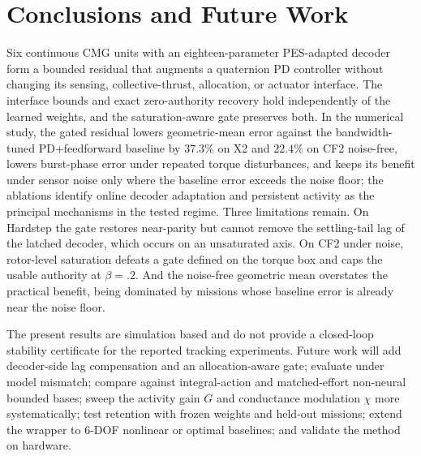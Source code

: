 \documentclass[letterpaper, 10 pt, conference]{ieeeconf}
\begin{document}
\section{Conclusions and Future Work}
\label{sec:conclusion}
Six continuous CMG units with an eighteen-parameter PES-adapted decoder form a bounded residual that augments a quaternion PD controller without changing its sensing, collective-thrust, allocation, or actuator interface. The interface bounds and exact zero-authority recovery hold independently of the learned weights, and the saturation-aware gate preserves both. In the numerical study, the gated residual lowers geometric-mean error against the bandwidth-tuned PD+feedforward baseline by $37.3\%$ on X2 and $22.4\%$ on CF2 noise-free, lowers burst-phase error under repeated torque disturbances, and keeps its benefit under sensor noise only where the baseline error exceeds the noise floor; the ablations identify online decoder adaptation and persistent activity as the principal mechanisms in the tested regime. Three limitations remain. On Hardstep the gate restores near-parity but cannot remove the settling-tail lag of the latched decoder, which occurs on an unsaturated axis. On CF2 under noise, rotor-level saturation defeats a gate defined on the torque box and caps the usable authority at $\beta=.2$. And the noise-free geometric mean overstates the practical benefit, being dominated by missions whose baseline error is already near the noise floor.

The present results are simulation based and do not provide a closed-loop stability certificate for the reported tracking experiments. Future work will add decoder-side lag compensation and an allocation-aware gate; evaluate under model mismatch; compare against integral-action and matched-effort non-neural bounded bases; sweep the activity gain $G$ and conductance modulation $\chi$ more systematically; test retention with frozen weights and held-out missions; extend the wrapper to 6-DOF nonlinear or optimal baselines; and validate the method on hardware.



\end{document}

